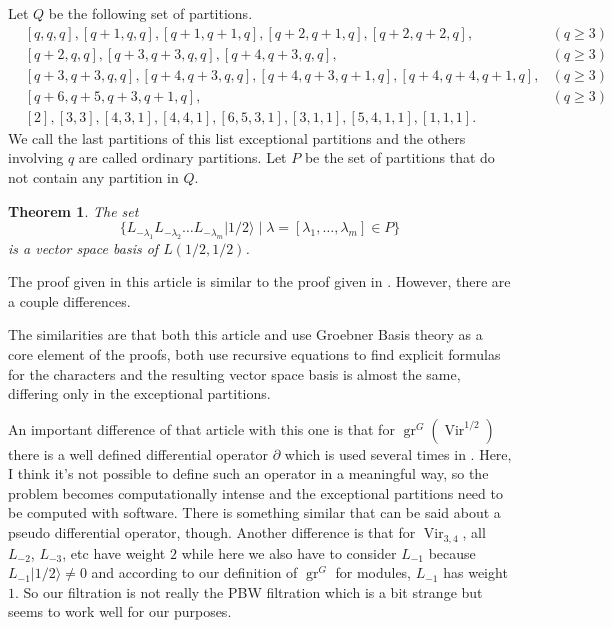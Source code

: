 \documentclass[12pt,a4paper]{article}
\newtheorem{theorem}{Theorem}
\DeclareMathOperator{\Vir}{Vir}
\DeclareMathOperator{\gr}{gr}
\newcommand{\vachalf}{|1/2\rangle}
\begin{document}
Let $Q$ be the following set of partitions.
\begin{align*}
  &[q,q,q],[q+1,q,q],[q+1,q+1,q],[q+2,q+1,q],[q+2,q+2,q], &(q\ge 3) \\
  &[q+2,q,q], [q+3,q+3,q,q], [q+4,q+3,q,q], &(q\ge 3) \\
  &[q+3,q+3,q,q], [q+4,q+3,q,q], [q+4,q+3,q+1,q], [q+4,q+4,q+1,q], &(q\ge 3) \\
  &[q+6,q+5,q+3,q+1,q], &(q\ge 3) \\
  &[2],[3,3],[4,3,1],[4,4,1],[6,5,3,1],[3,1,1],[5,4,1,1],[1,1,1].
\end{align*}
We call the last partitions of this list exceptional partitions and the others involving $q$ are called ordinary partitions.
Let $P$ be the set of partitions that do not contain any partition in $Q$.
\begin{theorem}
  \label{thr:4}
  The set
  \begin{equation*}
    \{L_{-\lambda_1}L_{-\lambda_2}\dots L_{-\lambda_m}\vachalf\mid \lambda=[\lambda_1,\dots,\lambda_m] \in P\}
  \end{equation*}
  is a vector space basis of $L(1/2,1/2)$.
\end{theorem}

The proof given in this article is similar to the proof given in \cite{andrews_singular_2022}.
However, there are a couple differences.

The similarities are that both this article and \cite{andrews_singular_2022} use Groebner Basis theory as a core element of the proofs, both use recursive equations to find explicit formulas for the characters and the resulting vector space basis is almost the same, differing only in the exceptional partitions.

An important difference of that article with this one is that for $\gr^G(\Vir^{1/2})$ there is a well defined differential operator $\partial$ which is used several times in \cite{andrews_singular_2022}.
Here, I think it's not possible to define such an operator in a meaningful way, so the problem becomes computationally intense and the exceptional partitions need to be computed with software.
There is something similar that can be said about a pseudo differential operator, though.
Another difference is that for $\Vir_{3,4}$, all $L_{-2}$, $L_{-3}$, etc have weight $2$ while here we also have to consider $L_{-1}$ because $L_{-1}\vachalf\neq 0$ and according to our definition of $\gr^G$ for modules, $L_{-1}$ has weight $1$.
So our filtration is not really the PBW filtration which is a bit strange but seems to work well for our purposes.
\end{document}
